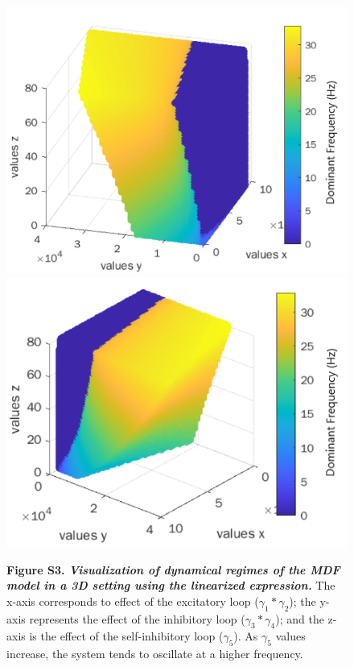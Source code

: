 \documentclass[12pt,twoside]{article}
\begin{document}
\begin{figure}[H]
    \centering
    \includegraphics[scale=0.6]{Images/3dmoran1.png}
    \includegraphics[scale=0.6]{Images/3dmoran2.png}
    \caption*{\textbf{Figure S3.  \textit{Visualization of dynamical regimes of the MDF model in a 3D setting using the linearized expression.}} The x-axis corresponds to effect of the excitatory loop ($\gamma_{1}*\gamma_{2}$); the y-axis represents the effect of the inhibitory loop ($\gamma_{3}*\gamma_{4}$); and the z-axis is the effect of the self-inhibitory loop ($\gamma_{5}$). As $\gamma_{5}$ values increase, the system tends to oscillate at a higher frequency.}
    \label{fig:3D_Moran}
\end{figure}
\end{document}
